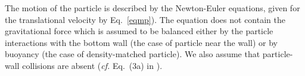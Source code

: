 The motion of the particle is described by the Newton-Euler equations, given for the translational velocity  by
Eq.\ \eqref{eqmp}).
The equation does not contain the gravitational force which is assumed to be balanced either by the particle interactions with the bottom wall (the case of particle near the wall) or by buoyancy (the case of density-matched particle). We also assume that particle-wall collisions are absent (\textit{cf.} Eq.\ (3a) in \cite{ibm}).

